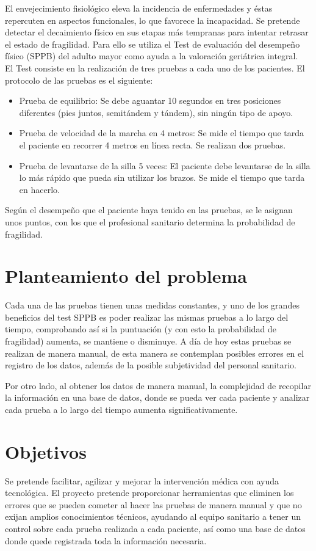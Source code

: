 \documentclass[12pt,oneside,a4paper]{article}
\begin{document}
El envejecimiento fisiológico eleva la incidencia de enfermedades y éstas repercuten en aspectos funcionales, lo que favorece la incapacidad. Se pretende detectar el decaimiento físico en sus etapas más tempranas para intentar retrasar el estado de fragilidad. Para ello se utiliza el Test de evaluación del desempeño físico (SPPB) del adulto mayor como ayuda a la valoración geriátrica integral. \\
El Test consiste en la realización de tres pruebas a cada uno de los pacientes. El protocolo de las pruebas es el siguiente: \\
\begin{itemize}
\item Prueba de equilibrio: Se debe aguantar 10 segundos en tres posiciones diferentes (pies juntos, semitándem y tándem), sin ningún tipo de apoyo. \\
\item Prueba de velocidad de la marcha en 4 metros: Se mide el tiempo que tarda el paciente en recorrer 4 metros en línea recta. Se realizan dos pruebas.\\
\item Prueba de levantarse de la silla 5 veces: El paciente debe levantarse de la silla lo más rápido que pueda sin utilizar los brazos. Se mide el tiempo que tarda en hacerlo.
\end{itemize}
Según el desempeño que el paciente haya tenido en las pruebas, se le asignan unos puntos, con los que el profesional sanitario determina la probabilidad de fragilidad.

\section{Planteamiento del problema}
\hline
Cada una de las pruebas tienen unas medidas constantes, y uno de los grandes beneficios del test SPPB es poder realizar las mismas pruebas a lo largo del tiempo, comprobando así si la puntuación (y con esto la probabilidad de fragilidad) aumenta, se mantiene o disminuye. 
A día de hoy estas pruebas se realizan de manera manual, de esta manera se contemplan posibles errores en el registro de los datos, además de la posible subjetividad del personal sanitario.

Por otro lado, al obtener los datos de manera manual, la complejidad de recopilar la información en una base de datos, donde se pueda ver cada paciente y analizar cada prueba a lo largo del tiempo aumenta significativamente. 


\section{Objetivos}
\hline
Se pretende  facilitar, agilizar y mejorar la intervención médica con ayuda tecnológica. El proyecto pretende proporcionar herramientas que eliminen los errores que se pueden cometer al hacer las pruebas de manera manual y que no exijan amplios conocimientos técnicos, ayudando al equipo sanitario a tener un control sobre cada prueba realizada a cada paciente, así como una base de datos donde quede registrada toda la información necesaria.
\end{document}

